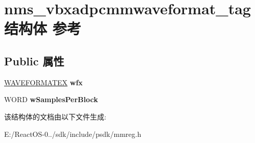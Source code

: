 \hypertarget{structnms__vbxadpcmmwaveformat__tag}{}\section{nms\+\_\+vbxadpcmmwaveformat\+\_\+tag结构体 参考}
\label{structnms__vbxadpcmmwaveformat__tag}
\subsection*{Public 属性}
\begin{DoxyCompactItemize}
\item 
\mbox{\label{structnms__vbxadpcmmwaveformat__tag_a3742276654c95f566f99e2a64f5b9b7e}} 
\hyperlink{struct_w_a_v_e_f_o_r_m_a_t_e_x}{W\+A\+V\+E\+F\+O\+R\+M\+A\+T\+EX} {\bfseries wfx}
\item 
\mbox{\label{structnms__vbxadpcmmwaveformat__tag_aa42a5508fbd0dfc9640555be8a1d411c}} 
W\+O\+RD {\bfseries w\+Samples\+Per\+Block}
\end{DoxyCompactItemize}


该结构体的文档由以下文件生成\+:\begin{DoxyCompactItemize}
\item 
E\+:/\+React\+O\+S-\/0../sdk/include/psdk/mmreg.\+h\end{DoxyCompactItemize}
